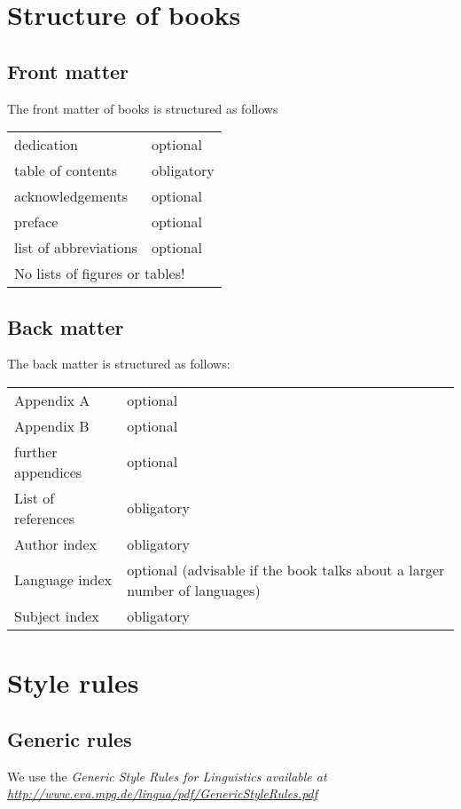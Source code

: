 \chapter{Structure of books}

\section{Front matter}

The front matter of \lsp books is structured as follows
\begin{table}[h]
\begin{tabular}{p{4cm}p{6cm}}
 dedication & optional\\
table of contents & obligatory\\ 
acknowledgements & optional\\
preface & optional\\
list of abbreviations & optional\\
\multicolumn{2}{l}{No lists of figures or tables!}\\
\end{tabular}
\end{table}
\section{Back matter}
The back matter is structured as follows:
\begin{table}[h]
\begin{tabular}{p{4cm}p{6cm}}
 Appendix A & optional \\
 Appendix B & optional \\
 further appendices & optional \\
 List of references & obligatory \\
 Author index & obligatory \\
 Language index  & optional (advisable if the book talks about a larger number of languages)\\
 Subject index & obligatory \\
\end{tabular}
 \end{table}


\chapter{Style rules}
\section{Generic rules}
We use the \em Generic Style Rules for Linguistics \em available at \url{http://www.eva.mpg.de/lingua/pdf/GenericStyleRules.pdf}

